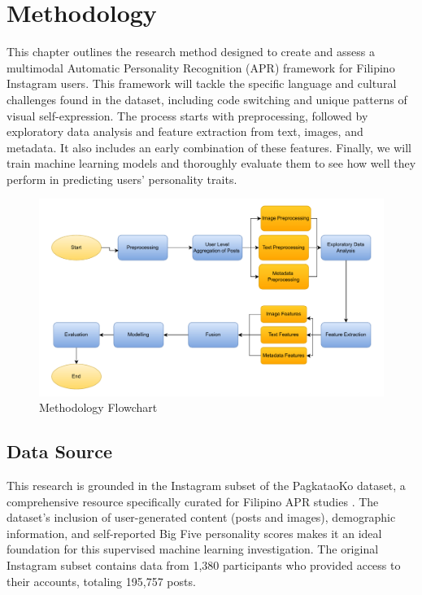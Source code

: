 \chapter{Methodology}
\label{sec:methodology}

This chapter outlines the research method designed to create and assess a multimodal Automatic Personality Recognition (APR) framework for Filipino Instagram users. This framework will tackle the specific language and cultural challenges found in the dataset, including code switching and unique patterns of visual self-expression. The process starts with  preprocessing, followed by exploratory data analysis and feature extraction from text, images, and metadata. It also includes an early combination of these features. Finally, we will train machine learning models and thoroughly evaluate them to see how well they perform in predicting users' personality traits.

\begin{figure}[H]
	\centering
	\includegraphics[width=\textwidth]{"figures/Methodology-Flowchart.pdf"}
	\caption{Methodology Flowchart}
	\label{fig:methodology_pipeline}
\end{figure}

\section{Data Source}
\label{sec:data}
This research is grounded in the Instagram subset of the PagkataoKo dataset, a comprehensive resource specifically curated for Filipino APR studies \citep{tighe_acorda_2022}. The dataset's inclusion of user-generated content (posts and images), demographic information, and self-reported Big Five personality scores makes it an ideal foundation for this supervised machine learning investigation. The original Instagram subset contains data from 1,380 participants who provided access to their accounts, totaling 195,757 posts.

